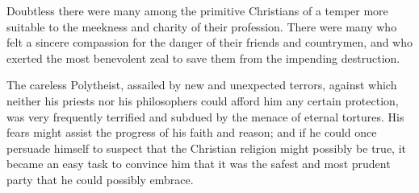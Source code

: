 Doubtless there were many among the primitive Christians of a
temper more suitable to the meekness and charity of their
profession. There were many who felt a sincere compassion for the
danger of their friends and countrymen, and who exerted the most
benevolent zeal to save them from the impending destruction.

The careless Polytheist, assailed by new and unexpected terrors,
against which neither his priests nor his philosophers could
afford him any certain protection, was very frequently terrified
and subdued by the menace of eternal tortures. His fears might
assist the progress of his faith and reason; and if he could once
persuade himself to suspect that the Christian religion might
possibly be true, it became an easy task to convince him that it
was the safest and most prudent party that he could possibly
embrace.

